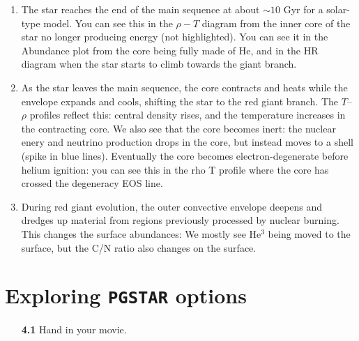 \documentclass[11pt,a4paper]{article}
\begin{document}
\begin{enumerate}
\begin{enumerate}
  \item The star reaches the end of the main sequence at about $\sim 10$ Gyr for a solar-type model.
  You can see this in the $\rho-T$ diagram from the inner core of the star no longer producing energy (not highlighted). You can see it in the Abundance plot from the core being fully made of He, and in the HR diagram when the star starts to climb towards the giant branch.
  
  
  \item 
  As the star leaves the main sequence, the core contracts and heats while the envelope expands and cools, shifting the star to the red giant branch. The $T$–$\rho$ profiles reflect this: central density rises, and the temperature increases in the contracting core. 
  We also see that the core becomes inert: the nuclear enery and neutrino production drops in the core, but instead moves to a shell (spike in blue lines).
  Eventually the core becomes electron-degenerate before helium ignition: you can see this in the rho T profile where the core has crossed the degeneracy EOS line. 
  
  
  \item 
  During red giant evolution, the outer convective envelope deepens and dredges up material from regions previously processed by nuclear burning. This changes the surface abundances: We mostly see He$^3$ being moved to the surface, but the C/N ratio also changes on the surface. 
  
\end{enumerate}




\end{enumerate}

\section{Exploring \texttt{PGSTAR} options} 

\begin{enumerate}
  \item[\bf{4.1}] 
Hand in your movie.
\end{enumerate}







\end{document}
